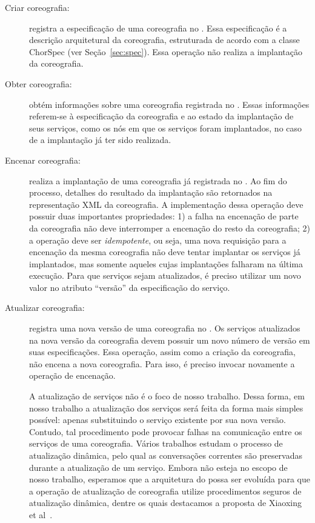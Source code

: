 \begin{description}

\item [Criar coreografia:] registra a especificação de uma coreografia no \ee. 
Essa especificação é a descrição arquitetural da coreografia, 
estruturada de acordo com a classe \textsf{ChorSpec} (ver Seção~\ref{sec:spec}). 
Essa operação não realiza a implantação da coreografia.

\item [Obter coreografia:] obtém informações sobre uma coreografia registrada no \ee. 
Essas informações referem-se à especificação da coreografia e ao estado da implantação 
de seus serviços, como os nós em que os serviços foram implantados, 
no caso de a implantação já ter sido realizada.

\item [Encenar coreografia:] realiza a implantação de uma coreografia já registrada no \ee. 
Ao fim do processo, detalhes do resultado da implantação são retornados na representação XML da coreografia. 
A implementação dessa operação deve possuir duas importantes propriedades: 
1) a falha na encenação de parte da coreografia não deve interromper a encenação do resto da coreografia; 
2) a operação deve ser \emph{idempotente}, ou seja, uma nova requisição para a encenação da mesma 
coreografia não deve tentar implantar os serviços já implantados, 
mas somente aqueles cujas implantações falharam na última execução. 
Para que serviços sejam atualizados, é preciso utilizar um novo valor no atributo ``versão'' da especificação do serviço.

\item [Atualizar coreografia:] registra uma nova versão de uma coreografia no \ee. 
Os serviços atualizados na nova versão da coreografia devem possuir 
um novo número de versão em suas especificações. 
Essa operação, assim como a criação da coreografia, não encena a nova coreografia. 
Para isso, é preciso invocar novamente a operação de encenação.

A atualização de serviços não é o foco de nosso trabalho.
Dessa forma, em nosso trabalho a atualização dos serviços será feita da forma mais simples possível: 
apenas substituindo o serviço existente por sua nova versão. 
Contudo, tal procedimento pode provocar falhas na comunicação entre os serviços de uma coreografia. 
Vários trabalhos \cite{Kramer1990Philosophers, Vandewoude2007Tranquility, Xiaoxing2011VersionConsistent} 
estudam o processo de atualização dinâmica, pelo qual as conversações correntes 
são preservadas durante a atualização de um serviço. 
Embora não esteja no escopo de nosso trabalho, esperamos que a arquitetura do \ee possa ser 
evoluída para que a operação de atualização de coreografia utilize procedimentos seguros de 
atualização dinâmica, dentre os quais destacamos a proposta de Xiaoxing et al~\cite{Xiaoxing2011VersionConsistent}.

\end{description}

